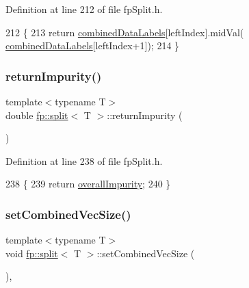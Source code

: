Definition at line 212 of file fp\+Split.\+h.


\begin{DoxyCode}
212                                               \{
213                     \textcolor{keywordflow}{return} \hyperlink{classfp_1_1split_ac8f54cf4a42335814e10e351c49e3c32}{combinedDataLabels}[leftIndex].midVal(
      \hyperlink{classfp_1_1split_ac8f54cf4a42335814e10e351c49e3c32}{combinedDataLabels}[leftIndex+1]);
214                 \}
\end{DoxyCode}
\mbox{\label{classfp_1_1split_a8501016c02cb2c36b3d40ee120da872e}} 
\subsubsection{\texorpdfstring{return\+Impurity()}{returnImpurity()}}
{\footnotesize\ttfamily template$<$typename T$>$ \\
double \hyperlink{classfp_1_1split}{fp\+::split}$<$ T $>$\+::return\+Impurity (\begin{DoxyParamCaption}{ }\end{DoxyParamCaption})\hspace{0.3cm}{\ttfamily [inline]}}



Definition at line 238 of file fp\+Split.\+h.


\begin{DoxyCode}
238                                               \{
239                     \textcolor{keywordflow}{return} \hyperlink{classfp_1_1split_a1eba74d8afed2852da3eb004afe76bb7}{overallImpurity};
240                 \}
\end{DoxyCode}
\mbox{\label{classfp_1_1split_a9c1560ae01a536ed0245d667ee7d5fb6}} 
\subsubsection{\texorpdfstring{set\+Combined\+Vec\+Size()}{setCombinedVecSize()}}
{\footnotesize\ttfamily template$<$typename T$>$ \\
void \hyperlink{classfp_1_1split}{fp\+::split}$<$ T $>$\+::set\+Combined\+Vec\+Size (\begin{DoxyParamCaption}{ }\end{DoxyParamCaption})\hspace{0.3cm}{\ttfamily [inline]}, {\ttfamily [protected]}}



